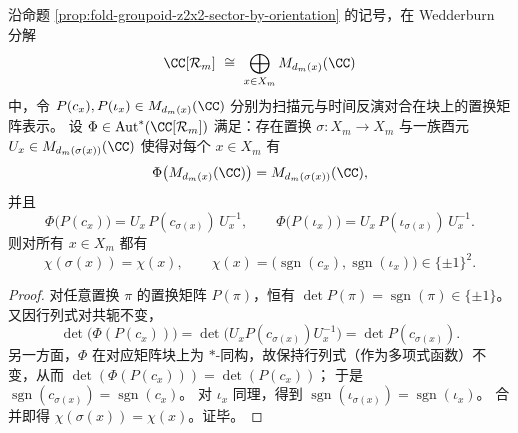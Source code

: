 \begin{theorem}\label{thm:fold-groupoid-chi-rigidity}
沿命题 \ref{prop:fold-groupoid-z2x2-sector-by-orientation} 的记号，在 Wedderburn 分解
\[
\CC[\mathcal R_m]\ \cong\ \bigoplus_{x\in X_m} M_{d_m(x)}(\CC)
\]
中，令 \(P(c_x),P(\iota_x)\in M_{d_m(x)}(\CC)\) 分别为扫描元与时间反演对合在块上的置换矩阵表示。
设 \(\Phi\in\mathrm{Aut}^{\ast}(\CC[\mathcal R_m])\) 满足：存在置换 \(\sigma:X_m\to X_m\) 与一族酉元
\(
U_x\in M_{d_m(\sigma(x))}(\CC)
\)
使得对每个 \(x\in X_m\) 有
\[
\Phi\!\left(M_{d_m(x)}(\CC)\right)=M_{d_m(\sigma(x))}(\CC),
\]
并且
\[
\Phi\!\bigl(P(c_x)\bigr)=U_x\,P(c_{\sigma(x)})\,U_x^{-1},
\qquad
\Phi\!\bigl(P(\iota_x)\bigr)=U_x\,P(\iota_{\sigma(x)})\,U_x^{-1}.
\]
则对所有 \(x\in X_m\) 都有
\[
\chi(\sigma(x))=\chi(x),
\qquad
\chi(x)=\bigl(\operatorname{sgn}(c_x),\operatorname{sgn}(\iota_x)\bigr)\in\{\pm1\}^2.
\]
\end{theorem}
\begin{proof}
对任意置换 \(\pi\) 的置换矩阵 \(P(\pi)\)，恒有 \(\det P(\pi)=\operatorname{sgn}(\pi)\in\{\pm1\}\)。
又因行列式对共轭不变，
\[
\det\!\bigl(\Phi(P(c_x))\bigr)
=\det\!\bigl(U_xP(c_{\sigma(x)})U_x^{-1}\bigr)
=\det P(c_{\sigma(x)}).
\]
另一方面，\(\Phi\) 在对应矩阵块上为 \(\ast\)-同构，故保持行列式（作为多项式函数）不变，从而
\(
\det(\Phi(P(c_x)))=\det(P(c_x))
\)；
于是 \(\operatorname{sgn}(c_{\sigma(x)})=\operatorname{sgn}(c_x)\)。
对 \(\iota_x\) 同理，得到 \(\operatorname{sgn}(\iota_{\sigma(x)})=\operatorname{sgn}(\iota_x)\)。
合并即得 \(\chi(\sigma(x))=\chi(x)\)。证毕。
\end{proof}

